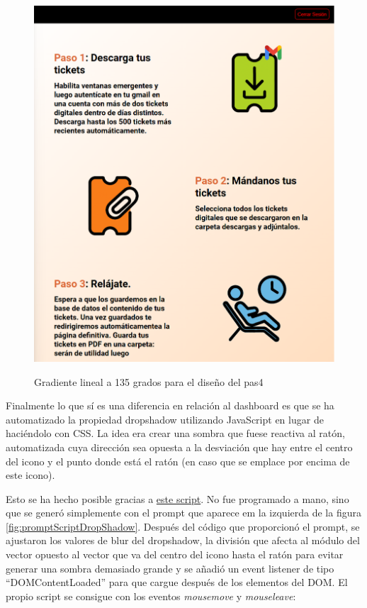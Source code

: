 \documentclass[a4paper,12pt]{report}
\begin{document}
	\FloatBarrier
	\begin{figure}[H]
		\centering
		\caption{Gradiente lineal a 135 grados para el diseño del pas4}
		\includegraphics[width=1\linewidth]{img/gradientLineal135grausPas4}
		\label{fig:gradientlineal135grauspas4}
	\end{figure}
	\FloatBarrier
	
	
	Finalmente lo que sí es una diferencia en relación al dashboard es que se ha automatizado la propiedad dropshadow utilizando JavaScript en lugar de haciéndolo con CSS. La idea era crear una sombra que fuese reactiva al ratón, automatizada cuya dirección sea opuesta a la desviación que hay entre el centro del icono y el punto donde está el ratón (en caso que se emplace por encima de este icono).
	
	Esto se ha hecho posible gracias a  \href{https://github.com/blackcub3s/mercApp/blob/main/APP%20WEB/__frontend__produccio__/app/js/pas4/dropShadowReactiu.js}{este script}. No fue programado a mano, sino que se generó simplemente con el prompt que aparece em la izquierda de la figura \ref{fig:promptScriptDropShadow}. Después del código que proporcionó el prompt, se ajustaron los valores de blur del dropshadow, la división que afecta al módulo del vector opuesto al vector que va del centro del icono hasta el ratón para evitar generar una sombra demasiado grande y se añadió un event listener de tipo ``DOMContentLoaded'' para que cargue después de los elementos del DOM. El propio script se consigue con los eventos \textit{mousemove} y \textit{mouseleave}:
	
\end{document}
